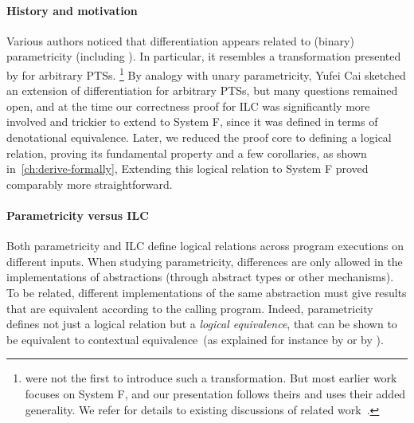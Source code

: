 

\paragraph{History and motivation}
Various authors noticed that differentiation appears related to (binary)
parametricity (including \citet{Atkey2015ILC}).
In particular, it resembles a transformation presented by
\citet{Bernardy2011realizability} for arbitrary PTSs.%
\footnote{\citeauthor{Bernardy2011realizability} were not the first to introduce
  such a transformation. But most earlier work
focuses on System F, and our presentation follows theirs and uses their added
generality. We refer for details to existing discussions of related
work~\citep{Wadler2007girardreynolds,Bernardy2011realizability}.}
By analogy with unary parametricity, Yufei Cai sketched an extension of
differentiation for arbitrary PTSs, but many questions remained open, and at the
time our correctness proof for ILC was significantly more involved and trickier
to extend to System F, since it was defined in terms of denotational equivalence.
Later, we reduced the proof core to defining a logical relation, proving its
fundamental property and a few corollaries, as shown in~\cref{ch:derive-formally},
Extending this logical relation to System F proved comparably more straightforward.

\paragraph{Parametricity versus ILC}
Both parametricity and ILC define logical relations across program executions on
different inputs. When studying parametricity, differences are only allowed in
the implementations of abstractions (through abstract types or other
mechanisms). To be related, different implementations of the same abstraction
must give results that are equivalent according to the calling program.
Indeed, parametricity defines not just a logical relation but a \emph{logical
equivalence}, that can be shown to be equivalent to contextual
equivalence~(as explained for instance by \citet[Ch.~48]{Harper2016PFPL} or by
\citet{Ahmed2006stepindexed}).

